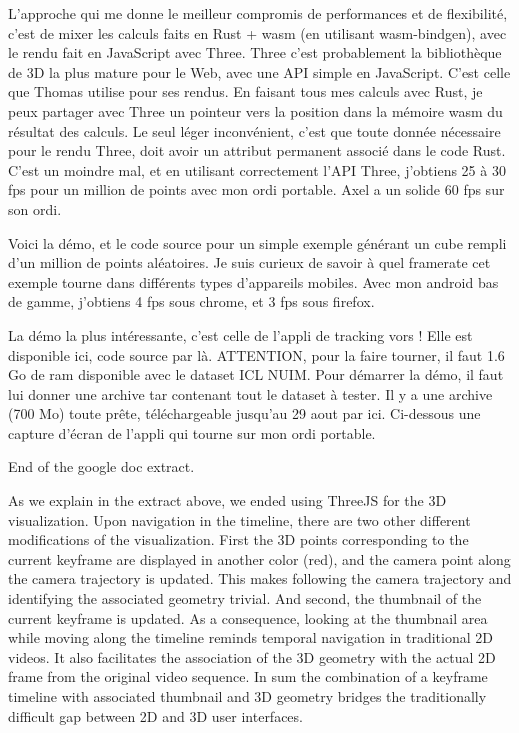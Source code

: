 L'approche qui me donne le meilleur compromis de performances et de flexibilité, c'est de mixer les calculs faits en Rust + wasm (en utilisant wasm-bindgen), avec le rendu fait en JavaScript avec Three. Three c'est probablement la bibliothèque de 3D la plus mature pour le Web, avec une API simple en JavaScript. C’est celle que Thomas utilise pour ses rendus. En faisant tous mes calculs avec Rust, je peux partager avec Three un pointeur vers la position dans la mémoire wasm du résultat des calculs. Le seul léger inconvénient, c'est que toute donnée nécessaire pour le rendu Three, doit avoir un attribut permanent associé dans le code Rust. C'est un moindre mal, et en utilisant correctement l'API Three, j'obtiens 25 à 30 fps pour un million de points avec mon ordi portable. Axel a un solide 60 fps sur son ordi.

Voici la démo, et le code source pour un simple exemple générant un cube rempli d'un million de points aléatoires. Je suis curieux de savoir à quel framerate cet exemple tourne dans différents types d'appareils mobiles. Avec mon android bas de gamme, j'obtiens 4 fps sous chrome, et 3 fps sous firefox.

La démo la plus intéressante, c'est celle de l'appli de tracking vors ! Elle est disponible ici, code source par là. ATTENTION, pour la faire tourner, il faut 1.6 Go de ram disponible avec le dataset ICL NUIM. Pour démarrer la démo, il faut lui donner une archive tar contenant tout le dataset à tester. Il y a une archive (700 Mo) toute prête, téléchargeable jusqu'au 29 aout par ici. Ci-dessous une capture d’écran de l’appli qui tourne sur mon ordi portable.

\alert{End of the google doc extract.}

As we explain in the extract above,
we ended using ThreeJS for the 3D visualization.
Upon navigation in the timeline, there are two other different modifications of the visualization.
First the 3D points corresponding to the current keyframe are displayed in another color (red),
and the camera point along the camera trajectory is updated.
This makes following the camera trajectory and identifying the associated geometry trivial.
And second, the thumbnail of the current keyframe is updated.
As a consequence, looking at the thumbnail area while moving along the timeline
reminds temporal navigation in traditional 2D videos.
It also facilitates the association of the 3D geometry with the actual 2D frame
from the original video sequence.
In sum the combination of a keyframe timeline with associated thumbnail
and 3D geometry bridges the traditionally difficult gap between 2D and 3D user interfaces.

